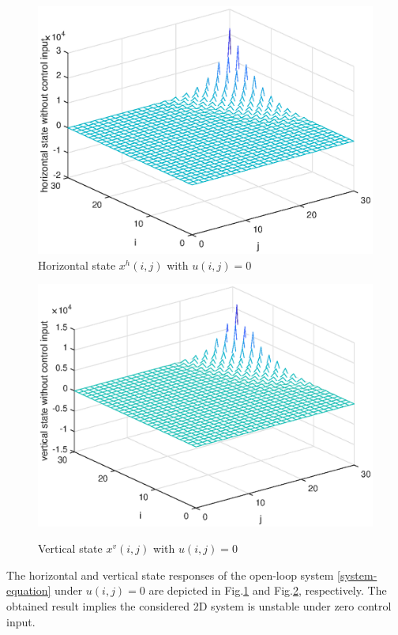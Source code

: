 \documentclass[journal,final,twocolumn]{IEEEtran}
\begin{document}
\begin{figure}[!htb]
\centering\includegraphics[scale=0.6]{./simulations/hx-no-controll-input.eps}
\caption{ Horizontal state $x^{h}(i,j)$ with $u(i,j)=0$}
\label{fig3}
\end{figure}
\begin{figure}[!htb]
\centering\includegraphics[scale=0.6]{./simulations/vx-no-controll-input.eps}\\ 
\caption{Vertical state $x^{v}(i,j)$ with $u(i,j)=0$}
\label{fig4}
\end{figure}
 The horizontal and vertical state responses of the open-loop system \eqref{system-equation} under $u(i,j) = 0$ are depicted in Fig.\ref{fig3} and Fig.\ref{fig4}, respectively. The obtained result implies the considered 2D system is unstable under zero control input. 
\end{document}
